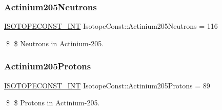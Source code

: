 \subsubsection{\texorpdfstring{Actinium205\+Neutrons}{Actinium205Neutrons}}
{\footnotesize\ttfamily \mbox{\hyperlink{group___isotope_const-_macros_ga5f18360b3e99483a35c32d789e62621c}{I\+S\+O\+T\+O\+P\+E\+C\+O\+N\+S\+T\+\_\+\+I\+NT}} Isotope\+Const\+::\+Actinium205\+Neutrons = 116}

\$ \$ Neutrons in Actinium-\/205. \mbox{\label{group___isotope_const-_actinium-_ac205_ga3e3380d44ca44f139477296363ccd06a}} 
\subsubsection{\texorpdfstring{Actinium205\+Protons}{Actinium205Protons}}
{\footnotesize\ttfamily \mbox{\hyperlink{group___isotope_const-_macros_ga5f18360b3e99483a35c32d789e62621c}{I\+S\+O\+T\+O\+P\+E\+C\+O\+N\+S\+T\+\_\+\+I\+NT}} Isotope\+Const\+::\+Actinium205\+Protons = 89}

\$ \$ Protons in Actinium-\/205. 